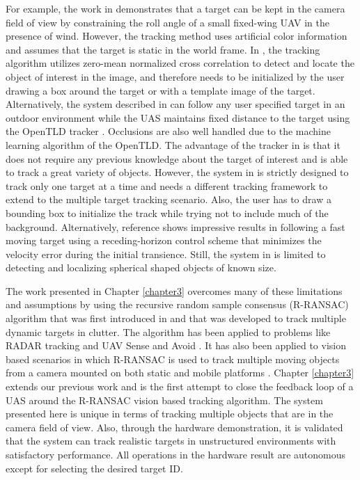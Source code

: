 For example, the work in \cite{Saunders2011} demonstrates that a target can be kept in the camera field of view by constraining the roll angle of a small fixed-wing UAV in the presence of wind. However, the tracking method uses artificial color information and assumes that the target is static in the world frame. In \cite{Qadir2011}, the tracking algorithm utilizes zero-mean normalized cross correlation to detect and locate the object of interest in the image, and therefore needs to be initialized by the user drawing a box around the target or with a template image of the target. Alternatively, the system described in \cite{Pestana2013} can follow any user specified target in an outdoor environment while the UAS maintains fixed distance to the target using the OpenTLD tracker \cite{Kalal2012}. Occlusions are also well handled due to the machine learning algorithm of the OpenTLD. The advantage of the tracker in \cite{Kalal2012} is that it does not require any previous knowledge about the target of interest and is able to track a great variety of objects. However, the system in \cite{Pestana2013} is strictly designed to track only one target at a time and needs a different tracking framework to extend to the multiple target tracking scenario. Also, the user has to draw a bounding box to initialize the track while trying not to include much of the background. Alternatively, reference \cite{Thomas2017} shows impressive results in following a fast moving target using a receding-horizon control scheme that minimizes the velocity error during the initial transience. Still, the system in \cite{Thomas2017} is limited to detecting and localizing spherical shaped objects of known size. 

The work presented in Chapter \ref{chapter3} overcomes many of these limitations and assumptions by using the recursive random sample consensus (R-RANSAC) algorithm that was first introduced in \cite{Niedfeldt2014} and that was developed to track multiple dynamic targets in clutter. The algorithm has been applied to problems like RADAR tracking \cite{Quist2016, Niedfeldt2014} and UAV Sense and Avoid \cite{Wikle2012}. It has also been applied to vision based scenarios in which R-RANSAC is used to track multiple moving objects from a camera mounted on both static and mobile platforms \cite{Ingersoll2015, Defranco2015}. Chapter \ref{chapter3} extends our previous work and is the first attempt to close the feedback loop of a UAS around the R-RANSAC vision based tracking algorithm. The system presented here is unique in terms of tracking multiple objects that are in the camera field of view. Also, through the hardware demonstration, it is validated that the system can track realistic targets in unstructured environments with satisfactory performance. All operations in the hardware result are autonomous except for selecting the desired target ID.

